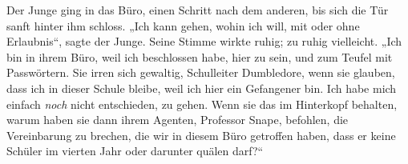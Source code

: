 Der Junge ging in das Büro, einen Schritt nach dem anderen, bis sich die Tür sanft hinter ihm schloss.
„Ich kann gehen, wohin ich will, mit oder ohne Erlaubnis“, sagte der Junge. Seine Stimme wirkte ruhig; zu ruhig vielleicht.
„Ich bin in ihrem Büro, weil ich beschlossen habe, hier zu sein, und zum Teufel mit Passwörtern. Sie irren sich gewaltig, Schulleiter Dumbledore, wenn sie glauben, dass ich in dieser Schule bleibe, weil ich hier ein Gefangener bin. Ich habe mich einfach \emph{noch} nicht entschieden, zu gehen. Wenn sie das im Hinterkopf behalten, warum haben sie dann ihrem Agenten, Professor Snape, befohlen, die Vereinbarung zu brechen, die wir in diesem Büro getroffen haben, dass er keine Schüler im vierten Jahr oder darunter quälen darf?“

